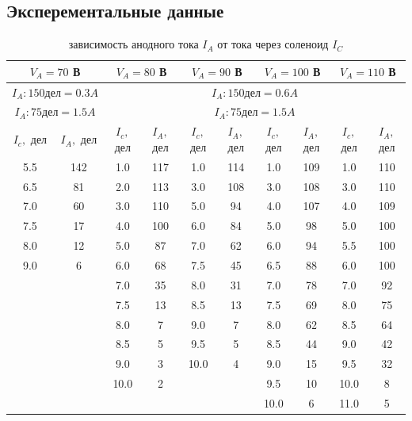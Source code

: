 \documentclass[a4paper]{article}
\begin{document}
\subsection*{Эксперементальные данные}

\begin{table}[h]
\begin{center}
\begin{tabular}{|c|c|c|c|c|c|c|c|c|c|}
\hline 
\multicolumn{2}{|c}{$V_A = 70$ В} & \multicolumn{2}{|c}{$V_A = 80$ В} & \multicolumn{2}{|c}{$V_A = 90$ В} & \multicolumn{2}{|c}{$V_A = 100$ В} & \multicolumn{2}{|c|}{$V_A = 110$ В} \\ 
\hline
\multicolumn{2}{|c}{$I_A: 150\text{дел} = 0.3A$} & \multicolumn{8}{|c|}{$I_A: 150\text{дел} = 0.6A$}\\
\multicolumn{2}{|c}{$I_A: 75\text{дел} = 1.5A$} & \multicolumn{8}{|c|}{$I_A: 75\text{дел} = 1.5A$}\\
\hline 
$I_c,$ дел & $I_A,$ дел & $I_c,$ дел & $I_A,$ дел & $I_c,$ дел & $I_A,$ дел & $I_c,$ дел & $I_A,$ дел & $I_c,$ дел & $I_A,$ дел \\ 
\hline 
5.5 & 142 & 1.0 & 117 & 1.0 & 114 & 1.0 & 109 & 1.0 & 110 \\ 
\hline 
6.5 & 81 & 2.0 & 113 & 3.0 & 108 & 3.0 & 108 & 3.0 & 110 \\ 
\hline 
7.0 & 60 & 3.0 & 110 & 5.0 & 94 & 4.0 & 107 & 4.0 & 109 \\ 
\hline 
7.5 & 17 & 4.0 & 100 & 6.0 & 84 & 5.0 & 98 & 5.0 & 100 \\ 
\hline 
8.0 & 12 & 5.0 & 87 & 7.0 & 62 & 6.0 & 94 & 5.5 & 100 \\ 
\hline 
9.0 & 6 & 6.0 & 68 & 7.5 & 45 & 6.5 & 88 & 6.0 & 100 \\ 
\hline 
\multicolumn{2}{|c|}{} & 7.0 & 35 & 8.0 & 31 & 7.0 & 78 & 7.0 & 92 \\ 
\cline{3-10} 
\multicolumn{2}{|c|}{} & 7.5 & 13 & 8.5 & 13 & 7.5 & 69 & 8.0 & 75 \\ 
\cline{3-10}
\multicolumn{2}{|c|}{} & 8.0 & 7 & 9.0 & 7 & 8.0 & 62 & 8.5 & 64 \\ 
\cline{3-10}
\multicolumn{2}{|c|}{} & 8.5 & 5 & 9.5 & 5 & 8.5 & 44 & 9.0 & 42 \\ 
\cline{3-10}
\multicolumn{2}{|c|}{} & 9.0 & 3 & 10.0 & 4 & 9.0 & 15 & 9.5 & 32 \\ 
\cline{3-10}
\multicolumn{2}{|c|}{} & 10.0 & 2 & \multicolumn{2}{c|}{} & 9.5 & 10 & 10.0 & 8 \\ 
\cline{3-4} \cline{7-10}
\multicolumn{6}{|c|}{} & 10.0 & 6 & 11.0 & 5 \\ 
\hline
\end{tabular} 
\caption{зависимость анодного тока $I_A$ от тока через соленоид $I_C$}
\end{center}
\end{table}
\end{document}
